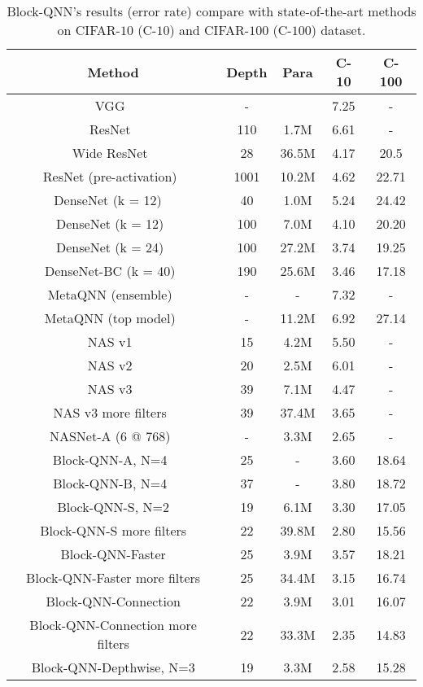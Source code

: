 \documentclass[10pt,journal,compsoc]{IEEEtran}
\begin{document}
\begin{table}[t!]
	\renewcommand{\arraystretch}{1.3}

	\begin{center}
		\caption{Block-QNN's results (error rate) compare with state-of-the-art methods on CIFAR-$10$ (C-$10$) and CIFAR-$100$ (C-$100$) dataset. }\label{table:3}	
		\footnotesize
		\begin{tabular}{c|c|c|c|c}
			\hline
			Method  & Depth &Para &C-10  &C-100 \\
			\hline
			\hline
			VGG~\cite{simonyan2014very} & - & &7.25 & -  \\
			\hline
			\hline
			ResNet~\cite{he2015deep} & 110 &1.7M &6.61 & -  \\
			\hline
			Wide ResNet~\cite{zagoruyko2016wide} & 28 & 36.5M&4.17 & 20.5  \\
			\hline
			ResNet (pre-activation)~\cite{he2016identity} & 1001 &10.2M &4.62 & 22.71 \\
			\hline
			DenseNet (k = 12) ~\cite{huang2016densely} & 40 & 1.0M&5.24 & 24.42 \\
			DenseNet (k = 12)~\cite{huang2016densely} & 100 &7.0M &4.10 & 20.20 \\
			DenseNet (k = 24)~\cite{huang2016densely} & 100 &27.2M &3.74 & 19.25 \\
			DenseNet-BC (k = 40)~\cite{huang2016densely} & 190 &25.6M &3.46 & 17.18  \\
			\hline
			\hline
			MetaQNN (ensemble)~\cite{baker2016designing} & - & - &7.32 & - \\
			MetaQNN (top model)~\cite{baker2016designing} & - & 11.2M &6.92 & 27.14 \\
			\hline
			NAS v1~\cite{zoph2016neural} & 15 & 4.2M&5.50 & - \\
			NAS v2~\cite{zoph2016neural} & 20 &2.5M &6.01 & - \\
			NAS v3~\cite{zoph2016neural} & 39 &7.1M &4.47 & - \\
			NAS v3 more filters~\cite{zoph2016neural} & 39 &37.4M &3.65 & - \\
			\hline
			NASNet-A (6 @ 768)~\cite{zoph2018learning}&-&3.3M&2.65&-\\
			\hline
			Block-QNN-A, N=4~\cite{zhong2018blockqnn} & 25 &-&3.60 &18.64  \\
			Block-QNN-B, N=4~\cite{zhong2018blockqnn} & 37 &-&3.80 & 18.72\\
			Block-QNN-S, N=2 & 19 &6.1M & 3.30 & 17.05 \\
			Block-QNN-S more filters &22&39.8M&2.80&15.56\\
			Block-QNN-Faster  &25&3.9M&3.57&18.21  \\
			Block-QNN-Faster more filters &25&34.4M&3.15&16.74  \\
			Block-QNN-Connection &22&3.9M&3.01&16.07\\
			Block-QNN-Connection more filters &22&33.3M&2.35&14.83\\
			Block-QNN-Depthwise, N=3 &19&3.3M&2.58&15.28  \\
			\hline
		\end{tabular}
	\end{center}

\end{table}
\end{document}
